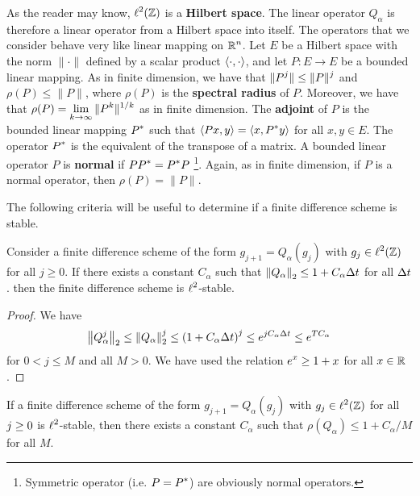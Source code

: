 As the reader may know, $\displaystyle \ell^2(\mathbb{Z})$ is a
{\bfseries Hilbert space}.  The linear
operator $Q_\alpha$ is therefore a linear operator from a Hilbert
space into itself.  The operators that we consider behave very like
linear mapping on $\displaystyle \mathbb{R}^n$.   Let $E$ be a Hilbert space
with the norm $\|\cdot\|$ defined by a scalar product
$\left\langle{\cdot} , {\cdot}\right\rangle$, and let
$P:E \to E$ be a bounded linear mapping.  As in finite dimension, we
have that $\displaystyle \|P^j\| \leq \|P\|^j$ and $\rho(P) \leq \|P\|$,
where $\rho(P)$ is the
{\bfseries spectral radius} of
$P$.  Moreover, we have that
$\displaystyle \rho(P) = \lim_{k\to \infty} \|P^k\|^{1/k}$ as in
finite dimension.  The
{\bfseries adjoint}
of $P$ is the bounded linear mapping $\displaystyle P^\ast$ such that
$\displaystyle \left\langle{Px} , {y}\right\rangle = \left\langle{x} , {P^\ast y}\right\rangle$ for all $x,y \in E$.
The operator $\displaystyle P^\ast$ is the equivalent of the transpose of a \nn
matrix.  A bounded linear operator $P$ is
{\bfseries normal}
if $\displaystyle P P^\ast = P^\ast P$
\footnote{Symmetric operator (i.e. $\displaystyle P = P^\ast$) are
obviously normal operators.}.  Again, as in finite dimension, if $P$
is a normal operator, then $\rho(P) = \|P\|$.

The following criteria will be useful to determine if a finite
difference scheme is stable.

\begin{prop}[Lax] \label{LaxN1}
Consider a finite difference scheme of the form $g_{j+1} = Q_\alpha(g_j)$
with $\displaystyle g_j \in \ell^2(\mathbb{Z})$ for all $j \geq 0$.  If there exists a
constant $C_\alpha$ such that
$\displaystyle \left\|Q_\alpha \right\|_2 \leq 1 + C_\alpha \Delta{t}$ for all
$\Delta{t}$. then the finite difference scheme is $\displaystyle \ell^2$-stable.
\end{prop}

\begin{proof}
We have
\[
\left\|Q_\alpha^j \right\|_2 \leq \left\|Q_\alpha \right\|_2^j
\leq \left( 1 + C_\alpha \Delta{t} \right)^j
\leq  e^{j C_\alpha \Delta{t}} \leq e^{T C_\alpha}
\]
for $0 < j \leq M$ and all $M>0$.
We have used the relation $\displaystyle e^x \geq 1 + x$ for all $x \in \mathbb{R}$.
\end{proof}

\begin{prop} \label{vonNNo1}
If a finite difference scheme of the form $g_{j+1} = Q_\alpha(g_j)$
with $\displaystyle g_j \in \ell^2(\mathbb{Z})$ for all
$\displaystyle j \geq 0$ is $\displaystyle \ell^2$-stable, then
there exists a constant $C_\alpha$ such that
$\rho(Q_\alpha) \leq 1 + C_\alpha/M$ for all $M$.
\end{prop}

